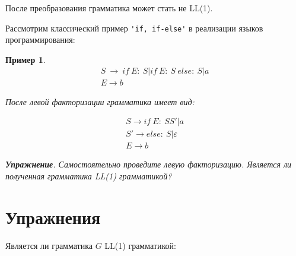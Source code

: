 \documentclass[10pt]{article}         %
\newtheorem{example}{Пример}
\newtheorem{theorem}{Теорема}
\begin{document}
	После преобразования грамматика может стать не LL(1).
	
	Рассмотрим классический пример \verb|'if, if-else'| в реализации языков программирования:
	
	\begin{example}
		\begin{align*}
			S\ \to \ if\ E:\ S | if\ E:\ S\ else:\ S | a \\
			E \to b
		\end{align*}
		
		После левой факторизации грамматика имеет вид:
		
		\begin{align*}
			S \to if\ E:\ SS' | a \\
			S' \to else:\ S | \varepsilon \\
			E \to b
		\end{align*}
		
		
		\textbf{Упражнение}. Самостоятельно проведите левую факторизацию. Является ли полученная грамматика LL(1) грамматикой?
		
	\end{example}
	\section{Упражнения}
	
	
	Является ли грамматика $G$ LL(1) грамматикой:
	
\end{document}
